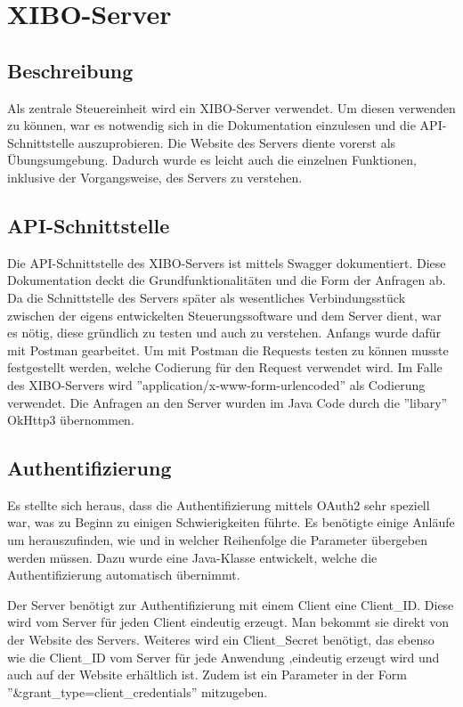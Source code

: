 \chapter{XIBO-Server}
\section{Beschreibung}
Als zentrale Steuereinheit wird ein XIBO-Server verwendet. Um diesen verwenden zu können, war es notwendig sich in die Dokumentation einzulesen und die API-Schnittstelle auszuprobieren. Die Website des Servers diente vorerst als Übungsumgebung. Dadurch wurde es leicht auch die einzelnen Funktionen, inklusive der Vorgangsweise, des Servers zu verstehen.
\cite{xibo-server}
\section{API-Schnittstelle}
Die API-Schnittstelle des XIBO-Servers ist mittels Swagger dokumentiert. Diese Dokumentation deckt die Grundfunktionalitäten und die Form der Anfragen ab. Da die Schnittstelle des Servers später als wesentliches Verbindungsstück zwischen der eigens entwickelten Steuerungssoftware und dem Server dient, war es nötig, diese gründlich zu testen und auch zu verstehen. Anfangs wurde dafür mit Postman gearbeitet. Um mit Postman die Requests testen zu können musste festgestellt werden, welche Codierung für den Request verwendet wird. Im Falle des XIBO-Servers wird ''application/x-www-form-urlencoded'' als Codierung verwendet. Die Anfragen an den Server wurden im Java Code durch die ''libary'' OkHttp3 übernommen.
\cite{swagger}
\cite{postman}
\cite{Okhttp3}
\section{Authentifizierung}
Es stellte sich heraus, dass die Authentifizierung mittels OAuth2 sehr speziell war, was zu Beginn zu einigen Schwierigkeiten führte. Es benötigte einige Anläufe  um herauszufinden, wie und in welcher Reihenfolge die Parameter übergeben werden müssen. Dazu wurde eine Java-Klasse entwickelt, welche die Authentifizierung automatisch übernimmt.
\cite{oAuth2}

Der Server benötigt zur Authentifizierung mit einem Client eine Client\_ID. Diese wird vom Server für jeden Client eindeutig erzeugt. Man bekommt sie direkt von der Website des Servers. 
Weiteres wird ein Client\_Secret benötigt, das ebenso wie die Client\_ID vom Server für jede Anwendung ,eindeutig erzeugt wird und auch auf der Website erhältlich ist. Zudem ist ein Parameter in der Form ''&grant\_type=client\_credentials'' mitzugeben.

